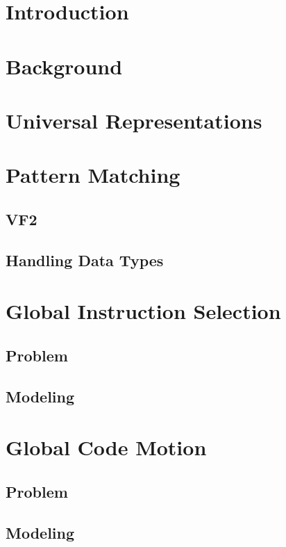 \documentclass[twoside]{kthdiss}
\begin{document}
\frontmatter



\tableofcontents
\listoffigures
\listoftables

\mainmatter

\chapter{Introduction}

\chapter{Background}

\chapter{Universal Representations}

\chapter{Pattern Matching}
\section{VF2}
\section{Handling Data Types}

\chapter{Global Instruction Selection}
\section{Problem}
\section{Modeling}

\chapter{Global Code Motion}
\section{Problem}
\section{Modeling}
\end{document}
